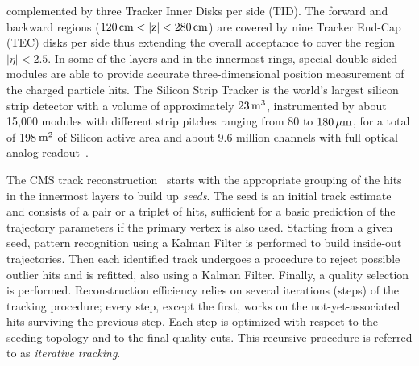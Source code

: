 complemented by three Tracker Inner Disks 
per side (TID). The forward and backward
regions ($120\rm \, cm < |z| < 280\rm \, cm$) are covered by nine Tracker
End-Cap (TEC) disks per side
thus extending the overall acceptance to cover the region
$|\eta|<2.5$. In some of the layers and in the innermost 
rings, special double-sided modules
are able to provide accurate three-dimensional position measurement of the charged
particle hits.  The Silicon Strip Tracker is the world's largest silicon
strip detector with a volume of approximately $23\rm \, m^3$, instrumented by about 15,000 modules
with different strip pitches ranging from 80 to $180\, \mu \rm m$, for a total
of 198$\rm \, m^2$ of Silicon active area and about 9.6 million channels with full optical analog readout~\cite{cms}\cite{TkTDR}\cite{TkTDRadd}.



The CMS track reconstruction~\cite{trackreco} starts with the appropriate grouping of the hits
in the innermost layers to build up {\em seeds}. The seed is an initial track
estimate and consists of a pair or a triplet of hits, sufficient for a
basic prediction of the trajectory parameters if the primary vertex is
 also used. Starting from a given seed, pattern recognition using a Kalman Filter
is performed to build inside-out trajectories. Then each identified
track undergoes a procedure to reject possible outlier hits and is
refitted, also using a Kalman Filter. Finally, a quality selection is
performed. Reconstruction efficiency relies on several iterations (steps) of the
tracking procedure; every step, except the first, works on the
not-yet-associated hits surviving the previous step. Each step is
optimized with respect to the seeding topology and to the final
quality cuts. This recursive procedure is referred to as {\em
  iterative tracking}.


